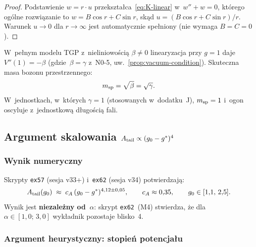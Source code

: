 \begin{proof}
Podstawienie $w = r\cdot u$ przekształca~\eqref{eq:K-linear} w~$w'' + w = 0$,
którego ogólne rozwiązanie to $w = B\cos r + C\sin r$,
skąd $u = (B\cos r + C\sin r)/r$.
Warunek $u\to 0$ dla $r\to\infty$ jest automatycznie spełniony
(nie wymaga $B = C = 0$).
\end{proof}

\begin{remark}
\label{rem:K-msp}
W~pełnym modelu TGP z~nieliniowością $\beta\neq 0$
linearyzacja przy $g=1$ daje $V''(1) = -\beta$ (gdzie~$\beta = \gamma$
z~N0-5, uw.~\ref{prop:vacuum-condition}).
Skuteczna masa bozonu przestrzennego:
\begin{equation}\label{eq:K-msp-full}
  m_{\rm sp} = \sqrt{\beta} = \sqrt{\gamma}.
\end{equation}
W~jednostkach, w~kt\'orych $\gamma = 1$ (stosowanych w~dodatku~J),
$m_{\rm sp} = 1$ i~ogon oscyluje z~jednostkową d\l{}ugością fali.
\end{remark}

\subsection{Argument skalowania $A_{\rm tail} \propto (g_0-g^*)^4$}%
\label{app:K-skalowanie}

\subsubsection{Wynik numeryczny}

Skrypty \texttt{ex57} (sesja v33+) i~\texttt{ex62} (sesja v34) potwierdzają:
\begin{equation}\label{eq:K-power-law}
  A_{\rm tail}(g_0) \;\approx\; c_A\,(g_0 - g^*)^{4{,}12\pm 0{,}05},
  \qquad
  c_A \approx 0{,}35,
  \qquad
  g_0 \in [1{,}1,\, 2{,}5].
\end{equation}
Wynik jest \textbf{niezależny od~$\alpha$}: skrypt \texttt{ex62}~(M4)
stwierdza, że dla $\alpha \in [1{,}0;\, 3{,}0]$ wykładnik pozostaje
blisko~4.

\subsubsection{Argument heurystyczny: stopień potencjału}

